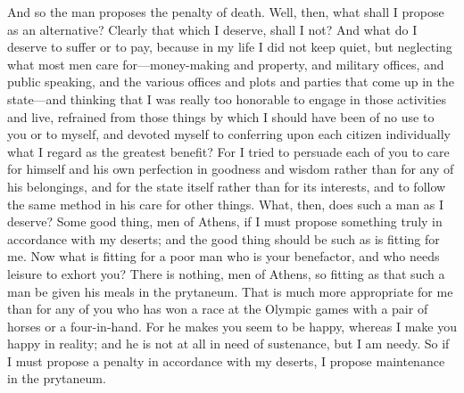 And so the man proposes the penalty of death. Well, then, what shall I propose as an alternative? Clearly that which I deserve, shall I not? And what do I deserve to suffer or to pay, because in my life I did not keep quiet, but neglecting what most men care for—money-making and property, and military offices, and public speaking, and the various offices and plots and parties that come up in the state—and thinking that I was really too honorable  to engage in those activities and live, refrained from those things by which I should have been of no use to you or to myself, and devoted myself to conferring upon each citizen individually what I regard as the greatest benefit? For I tried to persuade each of you to care for himself and his own perfection in goodness and wisdom rather than for any of his belongings, and for the state itself rather than for its interests, and to follow the same method in his care for other things. What, then, does such a man as I deserve?  Some good thing, men of Athens, if I must propose something truly in accordance with my deserts; and the good thing should be such as is fitting for me. Now what is fitting for a poor man who is your benefactor, and who needs leisure to exhort you? There is nothing, men of Athens, so fitting as that such a man be given his meals in the prytaneum. That is much more appropriate for me than for any of you who has won a race at the Olympic games with a pair of horses or a four-in-hand. For he makes you seem to be happy, whereas I make you happy in reality;  and he is not at all in need of sustenance, but I am needy. So if I must propose a penalty in accordance with my deserts,  I propose maintenance in the prytaneum.

